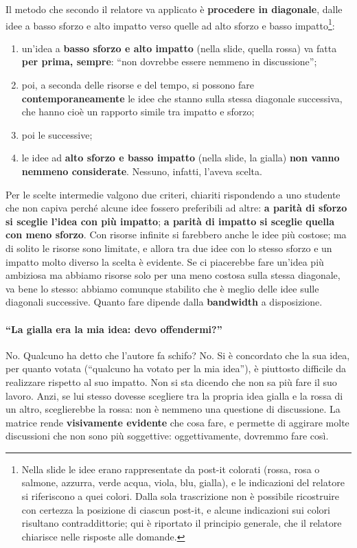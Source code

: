 Il metodo che secondo il relatore va applicato è \textbf{procedere in diagonale}, dalle
idee a basso sforzo e alto impatto verso quelle ad alto sforzo e basso
impatto\footnote{Nella slide le idee erano rappresentate da post-it colorati (rossa,
rosa o salmone, azzurra, verde acqua, viola, blu, gialla), e le indicazioni del
relatore si riferiscono a quei colori. Dalla sola trascrizione non è possibile
ricostruire con certezza la posizione di ciascun post-it, e alcune indicazioni sui
colori risultano contraddittorie; qui è riportato il principio generale, che il
relatore chiarisce nelle risposte alle domande.}:
\begin{enumerate}
  \item un'idea a \textbf{basso sforzo e alto impatto} (nella slide, quella rossa) va
        fatta \textbf{per prima, sempre}: ``non dovrebbe essere nemmeno in discussione'';
  \item poi, a seconda delle risorse e del tempo, si possono fare
        \textbf{contemporaneamente} le idee che stanno sulla stessa diagonale
        successiva, che hanno cioè un rapporto simile tra impatto e sforzo;
  \item poi le successive;
  \item le idee ad \textbf{alto sforzo e basso impatto} (nella slide, la gialla)
        \textbf{non vanno nemmeno considerate}. Nessuno, infatti, l'aveva scelta.
\end{enumerate}
Per le scelte intermedie valgono due criteri, chiariti rispondendo a uno studente che
non capiva perché alcune idee fossero preferibili ad altre: \textbf{a parità di sforzo si
sceglie l'idea con più impatto}; \textbf{a parità di impatto si sceglie quella con meno
sforzo}. Con risorse infinite si farebbero anche le idee più costose; ma di solito le
risorse sono limitate, e allora tra due idee con lo stesso sforzo e un impatto molto
diverso la scelta è evidente. Se ci piacerebbe fare un'idea più ambiziosa ma abbiamo
risorse solo per una meno costosa sulla stessa diagonale, va bene lo stesso: abbiamo
comunque stabilito che è meglio delle idee sulle diagonali successive. Quanto fare dipende
dalla \textbf{bandwidth} a disposizione.

\paragraph{``La gialla era la mia idea: devo offendermi?''} No. Qualcuno ha detto che
l'autore fa schifo? No. Si è concordato che la sua idea, per quanto votata (``qualcuno ha
votato per la mia idea''), è piuttosto difficile da realizzare rispetto al suo impatto.
Non si sta dicendo che non sa più fare il suo lavoro. Anzi, se lui stesso dovesse
scegliere tra la propria idea gialla e la rossa di un altro, sceglierebbe la rossa: non è
nemmeno una questione di discussione. La matrice rende \textbf{visivamente evidente} che
cosa fare, e permette di aggirare molte discussioni che non sono più soggettive:
oggettivamente, dovremmo fare così.

